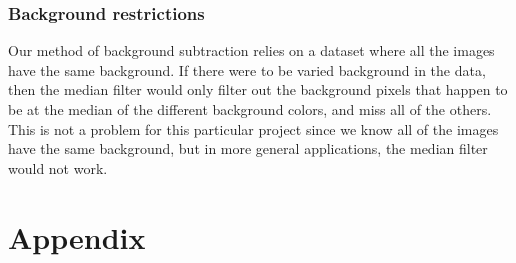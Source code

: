 \documentclass[12pt]{article}
\begin{document}
\subsubsection{Background restrictions}

Our method of background subtraction relies on a dataset where all the images have the same background. If there were to be varied background in the data, then the median filter would only filter out the background pixels that happen to be at the median of the different background colors, and miss all of the others. This is not a problem for this particular project since we know all of the images have the same background, but in more general applications, the median filter would not work.

\section*{Appendix}
\end{document}
